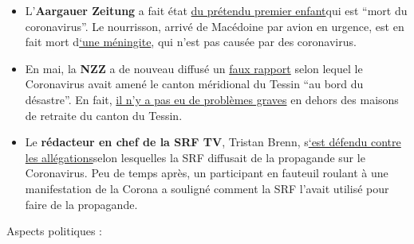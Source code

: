 \begin{itemize}
\tightlist
\item
  L'\textbf{Aargauer Zeitung} a fait état
  \href{https://www.aargauerzeitung.ch/aargau/kanton-aargau/erstes-kind-am-coronavirus-gestorben-aargauer-saeugling-zur-behandlung-heimgeflogen-137988950}{du
  prétendu premier enfant}qui est ``mort du coronavirus''. Le
  nourrisson, arrivé de Macédoine par avion en urgence, est en fait mort
  d\href{https://www.srf.ch/news/regional/aargau-solothurn/verwirrung-um-todesursache-trauriges-ereignis-aargauer-baby-stirbt-nach-corona-infektion}{`une
  méningite}, qui n'est pas causée par des coronavirus.
\item
  En mai, la \textbf{NZZ} a de nouveau diffusé un
  \href{https://www.nzz.ch/gesellschaft/wie-corona-das-tessin-an-den-rand-einer-katastrophe-brachte-und-die-willensnation-auf-die-probe-stellte-ld.1556749}{faux
  rapport} selon lequel le Coronavirus avait amené le canton méridional
  du Tessin ``au bord du désastre''. En fait,
  \href{https://www.blick.ch/news/schweiz/tessin/tessiner-spitaldirektor-widerspricht-dem-bundesamt-fuer-gesundheit-wir-haben-genuegend-intensivbetten-id15808076.html}{il
  n'y a pas eu de problèmes graves} en dehors des maisons de retraite du
  canton du Tessin.
\item
  Le \textbf{rédacteur en chef de la SRF TV}, Tristan Brenn,
  s\href{https://www.srf.ch/news/schweiz/berichterstattung-zu-corona-srf-chefredaktor-nimmt-stellung-zu-fakenews-vorwuerfen}{`est
  défendu contre les allégations}selon lesquelles la SRF diffusait de la
  propagande sur le Coronavirus. Peu de temps après, un participant en
  fauteuil roulant à une manifestation de la Corona a souligné comment
  la SRF l'avait utilisé pour faire de la propagande.
\end{itemize}

Aspects politiques :

